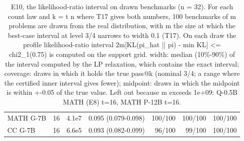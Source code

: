 \begin{table}[t]
\begin{tabular}{lrrrrrr}
MATH G-7B & 16 & 4.1e7 & 0.095 (0.079-0.098) & 100/100 & 100/100 & 100/100 \\
CC G-7B & 16 & 6.6e5 & 0.093 (0.082-0.099) & 96/100 & 99/100 & 100/100 \\
\bottomrule
\end{tabular}
\caption{E10, the likelihood-ratio interval on drawn benchmarks (n = 32). For each count law and k = t n where T17 gives both numbers, 100 benchmarks of m problems are drawn from the real distribution, with m the size at which the best-case interval at level 3/4 narrows to width 0.1 (T17). On each draw the profile likelihood-ratio interval 2m[KL(pi\_hat || pi) - min KL] <= chi2\_1(0.75) is computed on the support grid. width: median (10\%-90\%) of the interval computed by the LP relaxation, which contains the exact interval; coverage: draws in which it holds the true pass@k (nominal 3/4; a range where the certified inner interval gives fewer); midpoint: draws in which the midpoint is within +-0.05 of the true value. Left out because m exceeds 1e+09: Q-0.5B MATH (E8) t=16, MATH P-12B t=16.}
\label{tab:T21_likelihood_ratio_simulation}
\end{table}
